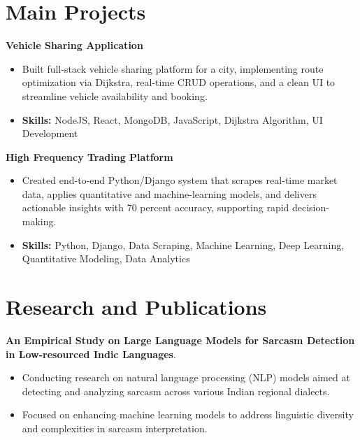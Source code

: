 \documentclass[a4paper,11pt]{article}
\begin{document}
\section{\textbf{Main Projects}}

\vspace{1mm}
  \textbf{Vehicle Sharing Application  }
\vspace{-1.5mm} %
\begin{itemize}
  \item Built full-stack vehicle sharing platform for a city, implementing route optimization via Dijkstra, real-time CRUD operations, and a clean UI to streamline vehicle availability and booking.
\vspace{-3mm}
  \item \textbf{Skills:} NodeJS, React, MongoDB, JavaScript, Dijkstra Algorithm, UI Development
\end{itemize}


\vspace{1mm}
   \textbf{High Frequency Trading Platform }
\vspace{-1.5mm} %
\begin{itemize}
  \item Created end-to-end Python/Django system that scrapes real-time market data, applies quantitative and machine-learning models, and delivers actionable insights with 70 percent accuracy, supporting rapid decision-making.
\vspace{-3mm}
  \item \textbf{Skills:} Python, Django, Data Scraping, Machine Learning, Deep Learning, Quantitative Modeling, Data Analytics
\end{itemize}



\section{\textbf{Research and Publications} \hfill }
\vspace{1mm}
  \textbf{An Empirical Study on Large Language Models for Sarcasm Detection in Low-resourced Indic Languages}.
\vspace{-1mm} %
\begin{itemize}
  \item Conducting research on natural language processing (NLP) models aimed at detecting and analyzing sarcasm across various Indian regional dialects.
\vspace{-3mm}
  \item Focused on enhancing machine learning models to address linguistic diversity and complexities in sarcasm interpretation.
\end{itemize}
\end{document}
